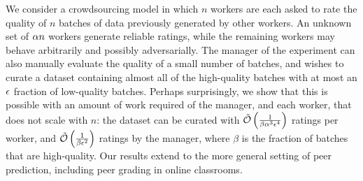 We consider a crowdsourcing model in which $n$ workers are each asked to 
rate the quality of $n$ batches of data previously generated by other workers.
An unknown set of $\alpha n$ workers generate reliable ratings, 
while the remaining workers may behave arbitrarily and possibly adversarially. 
The manager of the experiment can also manually evaluate the quality of a 
small number of batches, and wishes to curate a dataset containing almost all 
of the high-quality batches with at most an $\epsilon$ fraction of 
low-quality batches.  
Perhaps surprisingly, we show that this is possible with an 
amount of work required of the manager, and each worker, that does not scale 
with $n$: the dataset can be curated with
$\tilde{\mathcal{O}}\left( \frac{1}{\beta\alpha^3\epsilon^4} \right)$ 
ratings per worker, and $\tilde{\mathcal{O}}\left( \frac{1}{\beta\epsilon^2} \right)$ 
ratings by the manager, where $\beta$ is the fraction of batches that are 
high-quality.
Our results extend to the more general setting of peer prediction, 
including peer grading in online classrooms.
